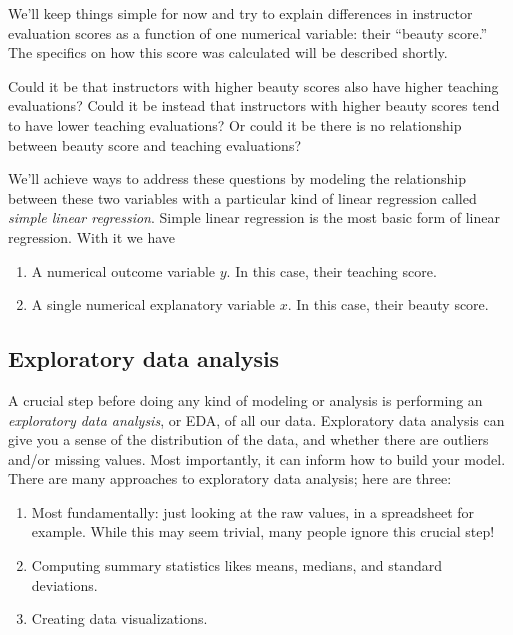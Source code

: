 \documentclass[12pt,]{krantz}
\providecommand{\tightlist}{%
  \setlength{\itemsep}{0pt}\setlength{\parskip}{0pt}}
\begin{document}
We'll keep things simple for now and try to explain differences in
instructor evaluation scores as a function of one numerical variable:
their ``beauty score.'' The specifics on how this score was calculated
will be described shortly.

Could it be that instructors with higher beauty scores also have higher
teaching evaluations? Could it be instead that instructors with higher
beauty scores tend to have lower teaching evaluations? Or could it be
there is no relationship between beauty score and teaching evaluations?

We'll achieve ways to address these questions by modeling the
relationship between these two variables with a particular kind of
linear regression called \emph{simple linear regression}. Simple linear
regression is the most basic form of linear regression. With it we have

\begin{enumerate}
\def\labelenumi{\arabic{enumi}.}
\tightlist
\item
  A numerical outcome variable \(y\). In this case, their teaching
  score.
\item
  A single numerical explanatory variable \(x\). In this case, their
  beauty score.
\end{enumerate}

\subsection{Exploratory data analysis}\label{model1EDA}

A crucial step before doing any kind of modeling or analysis is
performing an \emph{exploratory data analysis}, or EDA, of all our data.
Exploratory data analysis can give you a sense of the distribution of
the data, and whether there are outliers and/or missing values. Most
importantly, it can inform how to build your model. There are many
approaches to exploratory data analysis; here are three:

\begin{enumerate}
\def\labelenumi{\arabic{enumi}.}
\tightlist
\item
  Most fundamentally: just looking at the raw values, in a spreadsheet
  for example. While this may seem trivial, many people ignore this
  crucial step!
\item
  Computing summary statistics likes means, medians, and standard
  deviations.
\item
  Creating data visualizations.
\end{enumerate}
\end{document}
